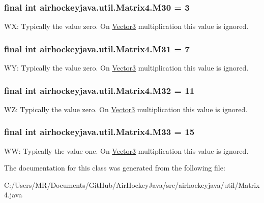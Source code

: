 \subsubsection[{M30}]{\setlength{\rightskip}{0pt plus 5cm}final int airhockeyjava.\+util.\+Matrix4.\+M30 = 3\hspace{0.3cm}{\ttfamily [static]}}\label{classairhockeyjava_1_1util_1_1_matrix4_ad2d49245936af678e5fba9da47a18159}
W\+X\+: Typically the value zero. On \hyperlink{classairhockeyjava_1_1util_1_1_vector3}{Vector3} multiplication this value is ignored. \hypertarget{classairhockeyjava_1_1util_1_1_matrix4_a2c4e47d24066bfa9a9a63879a8762862}{}
\subsubsection[{M31}]{\setlength{\rightskip}{0pt plus 5cm}final int airhockeyjava.\+util.\+Matrix4.\+M31 = 7\hspace{0.3cm}{\ttfamily [static]}}\label{classairhockeyjava_1_1util_1_1_matrix4_a2c4e47d24066bfa9a9a63879a8762862}
W\+Y\+: Typically the value zero. On \hyperlink{classairhockeyjava_1_1util_1_1_vector3}{Vector3} multiplication this value is ignored. \hypertarget{classairhockeyjava_1_1util_1_1_matrix4_af4ce88667776c574ee98ffb83c80ed8c}{}
\subsubsection[{M32}]{\setlength{\rightskip}{0pt plus 5cm}final int airhockeyjava.\+util.\+Matrix4.\+M32 = 11\hspace{0.3cm}{\ttfamily [static]}}\label{classairhockeyjava_1_1util_1_1_matrix4_af4ce88667776c574ee98ffb83c80ed8c}
W\+Z\+: Typically the value zero. On \hyperlink{classairhockeyjava_1_1util_1_1_vector3}{Vector3} multiplication this value is ignored. \hypertarget{classairhockeyjava_1_1util_1_1_matrix4_ab6e1e407ef893069c4a3654233390772}{}
\subsubsection[{M33}]{\setlength{\rightskip}{0pt plus 5cm}final int airhockeyjava.\+util.\+Matrix4.\+M33 = 15\hspace{0.3cm}{\ttfamily [static]}}\label{classairhockeyjava_1_1util_1_1_matrix4_ab6e1e407ef893069c4a3654233390772}
W\+W\+: Typically the value one. On \hyperlink{classairhockeyjava_1_1util_1_1_vector3}{Vector3} multiplication this value is ignored. 

The documentation for this class was generated from the following file\+:\begin{DoxyCompactItemize}
\item 
C\+:/\+Users/\+M\+R/\+Documents/\+Git\+Hub/\+Air\+Hockey\+Java/src/airhockeyjava/util/Matrix4.\+java\end{DoxyCompactItemize}
